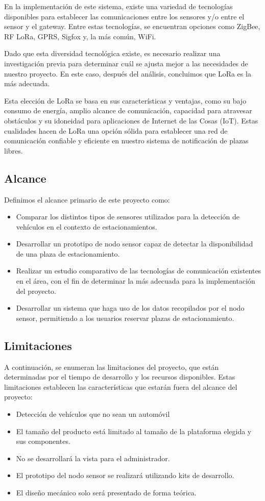 En la implementación de este sistema, existe una variedad de tecnologías disponibles para establecer las comunicaciones entre los sensores y/o entre el sensor y el gateway. Entre estas tecnologías, se encuentran opciones como ZigBee, RF LoRa, GPRS, Sigfox y, la más común, WiFi.

Dado que esta diversidad tecnológica existe, es necesario realizar una investigación previa para determinar cuál se ajusta mejor a las necesidades de nuestro proyecto. En este caso, después del análisis, concluimos que LoRa es la más adecuada.

Esta elección de LoRa se basa en sus características y ventajas, como su bajo consumo de energía, amplio alcance de comunicación, capacidad para atravesar obstáculos y su idoneidad para aplicaciones de Internet de las Cosas (IoT). Estas cualidades hacen de LoRa una opción sólida para establecer una red de comunicación confiable y eficiente en nuestro sistema de notificación de plazas libres.

\subsection{Alcance}
Definimos el alcance primario de este proyecto como: 
\begin{itemize}
    \item Comparar los distintos tipos de sensores utilizados para la detección de vehículos en el contexto de estacionamientos.
    \item Desarrollar un prototipo de nodo sensor capaz de detectar la disponibilidad de una plaza de estacionamiento.
    \item Realizar un estudio comparativo de las tecnologías de comunicación existentes en el área, con el fin de determinar la más adecuada para la implementación del proyecto.
    \item Desarrollar un sistema que haga uso de los datos recopilados por el nodo sensor, permitiendo a los usuarios reservar plazas de estacionamiento.
\end{itemize}

\subsection{Limitaciones}
A continuación, se enumeran las limitaciones del proyecto, que están determinadas por el tiempo de desarrollo y los recursos disponibles. Estas limitaciones establecen las características que estarán fuera del alcance del proyecto:
\begin{itemize}
    \item Detección de vehículos que no sean un automóvil
    \item El tamaño del producto está limitado al tamaño de la plataforma elegida y sus componentes.
    \item No se desarrollará la vista para el administrador.
    \item El prototipo del nodo sensor se realizará utilizando kits de desarrollo.
    \item El diseño mecánico solo será presentado de forma teórica.
\end{itemize}
